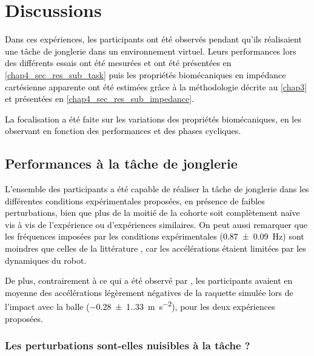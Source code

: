 \section{Discussions} \label{chap4_sec_discussion}

\textcolor{black}{Dans ces expériences, les participants ont été observés pendant qu'ils réalisaient une tâche de jonglerie dans un environnement virtuel. Leurs performances lors des différents essais ont été mesurées et ont été présentées en \cref{chap4_sec_res_sub_task} puis les propriétés biomécaniques en impédance cartésienne apparente ont été estimées grâce à la méthodologie décrite au \cref{chap3} et présentées en \cref{chap4_sec_res_sub_impedance}.}

\textcolor{black}{La focalisation a été faite sur les variations des propriétés biomécaniques, en les observant en fonction des performances et des phases cycliques.}

\subsection{Performances à la tâche de jonglerie}

\textcolor{black}{L'ensemble des participants a été capable de réaliser la tâche de jonglerie dans les différentes conditions expérimentales proposées, en présence de faibles perturbations, bien que plus de la moitié de la cohorte soit complètement naïve vis à vis de l'expérience ou d'expériences similaires. On peut aussi remarquer que les fréquences imposées par les conditions expérimentales (\SI{0.87\pm0.09}{\hertz}) sont moindres que celles de la littérature \parencite{morice_learning_2007,siegler_passive_2010}, car les accélérations étaient limitées par les dynamiques du robot.}

\textcolor{black}{De plus, contrairement à ce qui a été observé par \textcite{morice_learning_2007}, les participants avaient en moyenne des accélérations légèrement négatives de la raquette simulée lors de l'impact avec la balle (\SI{-0.28(1.33)}{\meter\per\second\squared}), pour les deux expériences proposées.}


\subsubsection{Les perturbations sont-elles nuisibles à la tâche ?}

